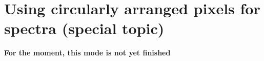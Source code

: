 \documentclass{report}
\begin{document}
\section{Using circularly arranged pixels for spectra (special topic)}
\label{sec-circular-pixel-arrangement}
%
{\bf For the moment, this mode is not yet finished}
%
% 
% 
% 
\end{document}
